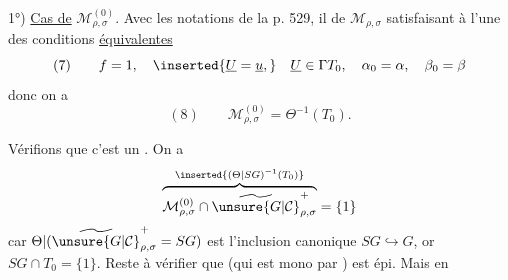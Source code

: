 1°) \uline{Cas de} $\mathcal M_{\rho,\sigma}^{(0)}$. Avec les notations
de la p. 529, il  
 de $\mathcal M_{\rho,\sigma}$ satisfaisant à l'une des conditions
\uline{équivalentes}
\[
(7)\qquad f=1,\quad\inserted{\underline U=\underline u,}\quad
\underline U\in\Gamma T_0,\quad \alpha_0=\alpha,\quad\beta_0=\beta
\]
donc on a
\[
(8)\qquad \mathcal M_{\rho,\sigma}^{(0)}=\Theta^{-1}(T_0).
\]

Vérifions que c'est un .
On a
\[
\overbrace{\mathcal M_{\rho,\sigma}^{(0)}\cap\widetilde{\unsure{G|\mathcal C}}_{\rho,\sigma}^{+}}
^{\inserted{(\Theta|SG)^{-1}(T_0)}}=\{1\}
\]
car $\Theta|(\widetilde{\unsure{G|\mathcal C}}_{\rho,\sigma}^{+}=SG)$ est l'inclusion
canonique $SG\hookrightarrow G$, or $SG\cap T_0=\{1\}$.
Reste à vérifier que
(qui est mono par ) est épi. Mais en



